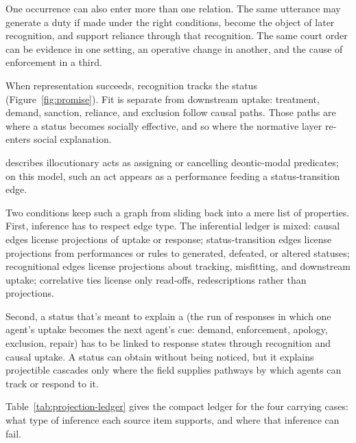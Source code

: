\documentclass[12pt]{article}
\begin{document}
One occurrence can also enter more than one relation. The same utterance  may generate a duty if made under the right conditions, become the object of later recognition, and support reliance through that recognition. The same court order can be evidence in one setting, an operative change in another, and the cause of enforcement in a third.

When representation succeeds, recognition tracks the status (Figure~\ref{fig:promise}). Fit is separate from downstream uptake: treatment, demand, sanction, reliance, and exclusion follow causal paths. Those paths are where a status becomes socially effective, and so where the normative layer re-enters social explanation.

\textcite{sbisa2023OnIllocutionaryTypes} describes illocutionary acts as assigning or cancelling deontic-modal predicates; on this model, such an act appears as a performance feeding a status-transition edge.


Two conditions keep such a graph from sliding back into a mere list of properties. First, inference has to respect edge type. The inferential ledger is mixed: causal edges license projections of uptake or response; status-transition edges license projections from performances or rules to generated, defeated, or altered statuses; recognitional edges license projections about tracking, misfitting, and downstream uptake; correlative ties license only read-offs, redescriptions rather than projections.

Second, a status that's meant to explain a  (the run of responses in which one agent's uptake becomes the next agent's cue: demand, enforcement, apology, exclusion, repair) has to be linked to response states through recognition and causal uptake. A status can obtain without being noticed, but it explains projectible cascades only where the field supplies pathways by which agents can track or respond to it.

Table~\ref{tab:projection-ledger} gives the compact ledger for the four carrying cases: what type of inference each source item supports, and where that inference can fail.
\end{document}
